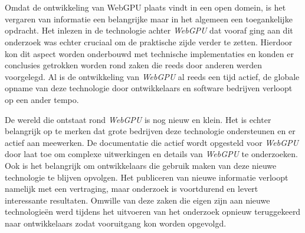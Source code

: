 
\chapter{}%
\label{ch:methodologie}


Omdat de ontwikkeling van WebGPU plaats vindt in een open domein, is het vergaren van informatie een belangrijke maar in het algemeen een toegankelijke opdracht. Het inlezen in de technologie achter \textit{WebGPU} dat vooraf ging aan dit onderzoek was echter cruciaal om de praktische zijde verder te zetten. Hierdoor kon dit aspect worden onderbouwd met technische implementaties en konden er conclusies getrokken worden rond zaken die reeds door anderen werden voorgelegd. Al is de ontwikkeling van \textit{WebGPU} al reeds een tijd actief, de globale opname van deze technologie door ontwikkelaars en software bedrijven verloopt op een ander tempo. 

\bigbreak{}

De wereld die ontstaat rond \textit{WebGPU} is nog nieuw en klein. Het is echter belangrijk op te merken dat grote bedrijven deze technologie ondersteunen en er actief aan meewerken. De documentatie die actief wordt opgesteld voor \textit{WebGPU} door \textcite{W3C2023} laat toe om complexe uitwerkingen en details van \textit{WebGPU} te onderzoeken. Ook is het belangrijk om ontwikkelaars die gebruik maken van deze nieuwe technologie te blijven opvolgen. Het publiceren van nieuwe informatie verloopt namelijk met een vertraging, maar onderzoek is voortdurend en levert interessante resultaten. Omwille van deze zaken die eigen zijn aan nieuwe technologieën werd tijdens het uitvoeren van het onderzoek opnieuw teruggekeerd naar ontwikkelaars zodat vooruitgang kon worden opgevolgd.

